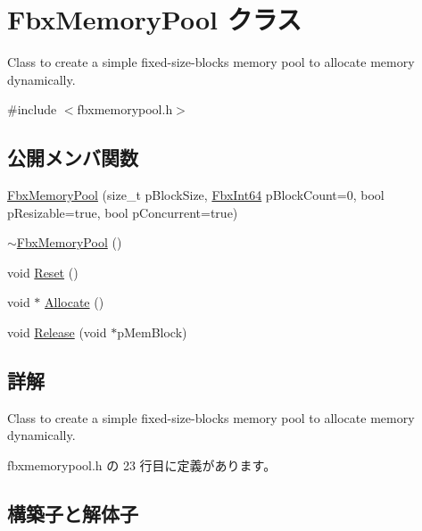 \hypertarget{class_fbx_memory_pool}{}\section{Fbx\+Memory\+Pool クラス}
\label{class_fbx_memory_pool}


Class to create a simple fixed-\/size-\/blocks memory pool to allocate memory dynamically.  




{\ttfamily \#include $<$fbxmemorypool.\+h$>$}

\subsection*{公開メンバ関数}
\begin{DoxyCompactItemize}
\item 
\hyperlink{class_fbx_memory_pool_a588f08af0ec9cb4f1338490d06444d51}{Fbx\+Memory\+Pool} (size\+\_\+t p\+Block\+Size, \hyperlink{fbxtypes_8h_ac7e1334c7c6aacc9c8a9dccddebb4368}{Fbx\+Int64} p\+Block\+Count=0, bool p\+Resizable=true, bool p\+Concurrent=true)
\item 
\hyperlink{class_fbx_memory_pool_a8674dda6c327078479eb19174b75c142}{$\sim$\+Fbx\+Memory\+Pool} ()
\item 
void \hyperlink{class_fbx_memory_pool_a9bd2739def7e1af783a5b97b83c3e8ff}{Reset} ()
\item 
void $\ast$ \hyperlink{class_fbx_memory_pool_aeccd6cbfc4f43a28fa16744a52ea877a}{Allocate} ()
\item 
void \hyperlink{class_fbx_memory_pool_adcac349666eea1d48455cfed673e4144}{Release} (void $\ast$p\+Mem\+Block)
\end{DoxyCompactItemize}


\subsection{詳解}
Class to create a simple fixed-\/size-\/blocks memory pool to allocate memory dynamically. 

 fbxmemorypool.\+h の 23 行目に定義があります。



\subsection{構築子と解体子}
\mbox{\label{class_fbx_memory_pool_a588f08af0ec9cb4f1338490d06444d51}} 
